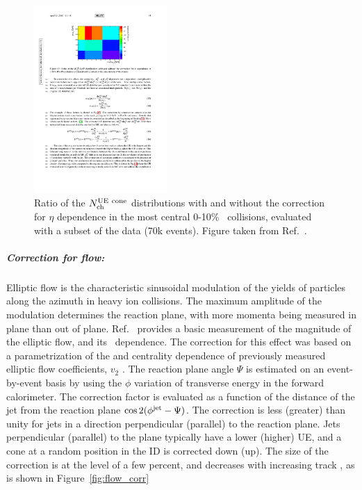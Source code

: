 \begin{figure}
\centering
\includegraphics[width=0.45\textwidth]{figures/main/UE/eta_correction.pdf}
\caption{ Ratio of the $\mbox{$N_{\mathrm{ch}}^{\mathrm{UE\ cone}}$}$ distributions with and without the correction for $\eta$ dependence in the most central 0-10\% \pbpb\ collisions, evaluated with a subset of the data (70k events).
Figure taken from Ref.~\cite{Sickles:2235420}.}
\label{fig:eta_corr}
\end{figure}


\subparagraph{Correction for flow: }  Elliptic flow is the characteristic sinusoidal modulation of the yields of particles along the azimuth in heavy ion collisions.
The maximum amplitude of the modulation determines the reaction plane, with more momenta being measured in plane than out of plane.
Ref.~\cite{Aaboud:2018ves} provides a basic measurement of the magnitude of the elliptic flow, and its \pt\ dependence.
The correction for this effect was based on a parametrization of the \pTch and centrality dependence of previously measured elliptic flow coefficients, $v_{2}$ \cite{Aaboud:2018ves}.
The reaction plane angle $\Psi$ is estimated on an event-by-event basis by using the $\phi$ variation of transverse energy in the forward calorimeter.
The correction factor is evaluated as a function of the distance of the jet from the reaction plane $\cos2(\mbox{$\phi^{\mathrm{jet}}$} - \Psi)$.
The correction is less (greater) than unity for jets in a direction perpendicular (parallel) to the reaction plane.
Jets perpendicular (parallel) to the plane typically have a lower (higher) UE, and a cone at a random position in the ID is corrected down (up).
The size of the correction is at the level of a few percent, and decreases with increasing track \pt, as is shown in Figure~\ref{fig:flow_corr}

